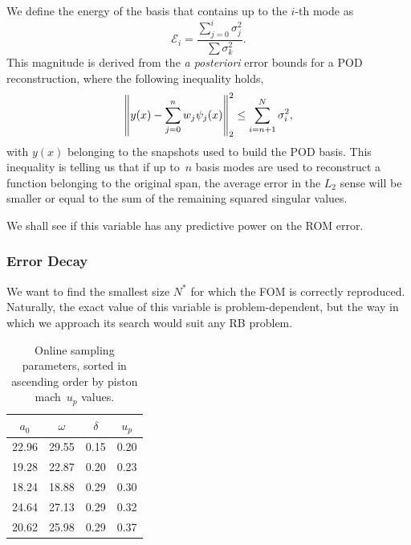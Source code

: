 \documentclass[../../thesis.tex]{subfiles}
\begin{document}
We define the energy of the basis that contains up to the $i$-th mode as
\begin{equation}
    \mathcal{E}_i = \frac{\sum_{j=0}^{i}\sigma_j^2}{\sum \sigma_k^2}.
\end{equation}
This magnitude is derived from the \textit{a posteriori} error bounds 
for a POD reconstruction, where the following inequality holds,
\begin{equation}
    \norm{y(x) - \sum_{j=0}^{n} w_j \psi_j(x)}_{2}^{2} \leq \sum_{i = n+1}^{N} \sigma_i^2,
\end{equation}
with $y(x)$ belonging to the snapshots used to build the POD basis.
This inequality is telling us that if up to~$n$ basis modes are used
to reconstruct a function belonging to the original span,
the average error in the $L_2$ sense will be smaller or equal
to the sum of the remaining squared singular values.

We shall see if this variable has any predictive power on the ROM error.

\subsubsection{Error Decay}
We want to find the smallest size $N^{*}$ for which the FOM is correctly reproduced.
Naturally, the exact value of this variable is problem-dependent, 
but the way in which we approach its search would suit any RB problem.
\begin{table}[h]
    \centering
    \caption{Online sampling parameters, 
    sorted in ascending order by piston mach~$u_p$ values.}
    \begin{tabular}{cccc}
    \toprule
        $a_0$ & $\omega$ & $\delta$ & $u_p$
        \\ \midrule
        22.96 &   29.55 & 0.15 &           0.20 \\
        19.28 &   22.87 & 0.20 &           0.23 \\
        18.24 &   18.88 & 0.29 &           0.30 \\
        24.64 &   27.13 & 0.29 &           0.32 \\
        20.62 &   25.98 & 0.29 &           0.37
        \\ \bottomrule
    \end{tabular}
\end{table}
\end{document}
